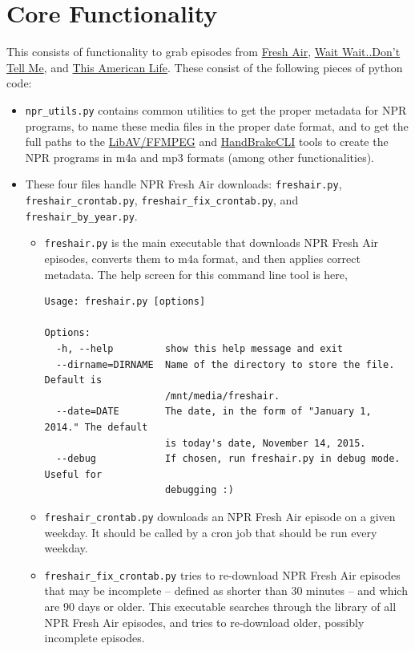 \documentclass[]{article}
\begin{document}
\section{Core Functionality}
This consists of functionality to grab episodes from \href{http://www.npr.org/programs/fresh-air/}{Fresh Air},  \href{http://www.npr.org/programs/wait-wait-dont-tell-me/}{Wait Wait..Don't Tell Me}, and \href{http://www.thisamericanlife.org/}{This American Life}. These consist of the following pieces of python code:
\begin{itemize}
  \item {\verb|npr_utils.py|} contains common utilities to get the proper metadata for NPR programs, to name these media files in the proper date format, and to get the full paths to the \href{https://libav.org}{LibAV/FFMPEG} and \href{https://handbrake.fr/}{HandBrakeCLI} tools to create the NPR programs in m4a and mp3 formats (among other functionalities).
  
  \item These four files handle NPR Fresh Air downloads: {\verb|freshair.py|}, {\verb|freshair_crontab.py|}, {\verb|freshair_fix_crontab.py|}, and {\verb|freshair_by_year.py|}.
  \begin{itemize}
  \item {\verb|freshair.py|} is the main executable that downloads NPR Fresh Air episodes, converts them to m4a format, and then applies correct metadata. The help screen for this command line tool is here,
\begin{verbatim}
Usage: freshair.py [options]

Options:
  -h, --help         show this help message and exit
  --dirname=DIRNAME  Name of the directory to store the file. Default is
                     /mnt/media/freshair.
  --date=DATE        The date, in the form of "January 1, 2014." The default
                     is today's date, November 14, 2015.
  --debug            If chosen, run freshair.py in debug mode. Useful for
                     debugging :)
\end{verbatim}
    
    \item {\verb|freshair_crontab.py|} downloads an NPR Fresh Air episode on a given weekday. It should be called by a cron job that should be run every weekday.
    
    \item {\verb|freshair_fix_crontab.py|} tries to re-download NPR Fresh Air episodes that may be incomplete -- defined as shorter than 30 minutes -- and which are 90 days or older. This executable searches through the library of all NPR Fresh Air episodes, and tries to re-download older, possibly incomplete episodes.
    

\end{itemize}
\end{itemize}
\end{document}
